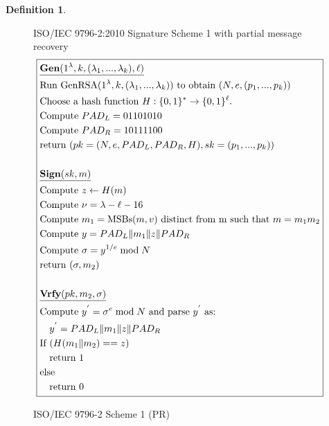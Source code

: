 \documentclass[]{final_report}
\theoremstyle{definition}
\newtheorem{definition}{Definition}[chapter]
\begin{document}
\begin{definition}
\begin{figure}[H]
\centering
\hfill ISO/IEC 9796-2:2010 Signature Scheme 1 with partial message recovery\hfill\phantom{} 
\[
\boxed{
\begin{aligned}
&\underline{\textbf{\text{Gen}} (1^\lambda, k, (\lambda_{1},...,\lambda_{k}), \ell)} \\
&\text{Run GenRSA}(1^\lambda, k, (\lambda_{1},...,\lambda_{k})) \text{ to obtain } (N, e, (p_{1},...,p_{k})) \\
&\text{Choose a hash function } H : \{0, 1\}^* \rightarrow \{0, 1\}^\ell. \\
&\text{Compute } PAD_{L} = 01101010 \\
&\text{Compute } PAD_{R} = 10111100 \\
&\text{return } (pk = (N, e, PAD_{L}, PAD_{R}, H), sk =  (p_{1},...,p_{k})) \\
\\
&\underline{\textbf{\text{Sign}} (sk, m)} \\
&\text{Compute } z \leftarrow H(m) \\
&\text{Compute } \nu = \lambda - \ell - 16 \\
&\text{Compute } m_{1} = \text{MSBs}(m, v) \text{ distinct from m such that } m = m_{1} m_{2} \\
&\text{Compute } y = PAD_{L} \| m_{1} \| z \| PAD_{R} \\
&\text{Compute } \sigma = y^{1/e} \bmod N \\
&\text{return } (\sigma, m_{2}) \\
\\
&\underline{\textbf{\text{Vrfy}} (pk, m_{2}, \sigma)} \\
&\text{Compute } y^{'} = \sigma^{e} \bmod N \text{ and parse } y^{'} \text{ as: } \\
&\quad y^{'} = PAD_{L} \| m_{1} \| z \| PAD_{R} \\
&\text{If } (H(m_{1} \| m_{2}) == z) \\
&\quad \text{return } 1 \\
&\text{else} \\
&\quad \text{return } 0 
\end{aligned}
}
\]
\caption{ISO/IEC 9796-2 Scheme 1 (PR)}
\label{fig:isoiec9796}
\end{figure}
\end{definition}
\end{document}
